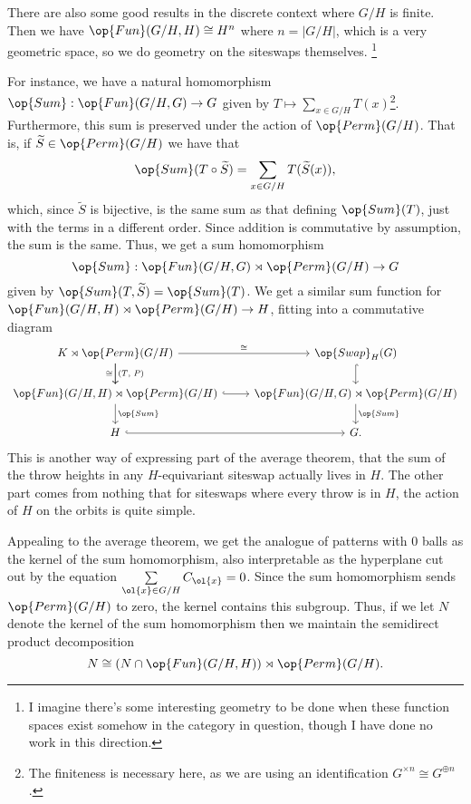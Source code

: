 \documentclass[12nt]{article}
\theoremstyle{plain}
\begin{document}
There are also some good results in the discrete context where $G/H$ is finite. Then we have $\op{Fun}(G/H, H) \cong H^n$ where $n = |G/H|$, which is a very geometric space, so we do geometry on the siteswaps themselves. \footnote{I imagine there's some interesting geometry to be done when these function spaces exist somehow in the category in question, though I have done no work in this direction.}

For instance, we have a natural homomorphism $\op{Sum} : \op{Fun}(G/H, G) \to G$ given by $T \mapsto \sum \limits_{x \in G/H} T(x)$\footnote{The finiteness is necessary here, as we are using an identification $G^{\times n} \cong G^{\oplus n}$.}. Furthermore, this sum is preserved under the action of $\op{Perm}(G/H)$. That is, if $\widetilde{S} \in \op{Perm}(G/H)$ we have that 
\[
\op{Sum}(T \circ \widetilde{S}) = \sum \limits_{x \in G/H} T(\widetilde{S}(x)),
\]
which, since $\widetilde{S}$ is bijective, is the same sum as that defining $\op{Sum}(T)$, just with the terms in a different order. Since addition is commutative by assumption, the sum is the same. Thus, we get a sum homomorphism 
\[
\op{Sum} : \op{Fun}(G/H, G) \rtimes \op{Perm}(G/H) \to G
\]
given by $\op{Sum}(T, \widetilde{S}) = \op{Sum}(T)$. We get a similar sum function for $\op{Fun}(G/H, H) \rtimes \op{Perm}(G/H) \to H$, fitting into a commutative diagram 
\[
\begin{tikzcd}
K \rtimes \op{Perm}(G/H) \ar[r, "\cong"] \ar[d, "(T \text{, } P)"] \ar[d, "\cong"'] & \op{Swap}_H(G) \ar[d, hookrightarrow] \\
\op{Fun}(G/H, H) \rtimes \op{Perm}(G/H) \ar[r, hookrightarrow] \ar[d, "\op{Sum}"] &  \op{Fun}(G/H, G) \rtimes \op{Perm}(G/H) \ar[d, "\op{Sum}"] \\
H \ar[r, hookrightarrow] & G.
\end{tikzcd}
\] 
This is another way of expressing part of the average theorem, that the sum of the throw heights in any $H$-equivariant siteswap actually lives in $H$. The other part comes from nothing that for siteswaps where every throw is in $H$, the action of $H$ on the orbits is quite simple. 

Appealing to the average theorem, we get the analogue of patterns with 0 balls as the kernel of the sum homomorphism, also interpretable as the hyperplane cut out by the equation $\sum \limits_{\ol{x} \in G/H} C_{\ol{x}} = 0$. Since the sum homomorphism sends $\op{Perm}(G/H)$ to zero, the kernel contains this subgroup. Thus, if we let $N$ denote the kernel of the sum homomorphism then we maintain the semidirect product decomposition 
\[
N \cong (N \cap \op{Fun}(G/H, H)) \rtimes \op{Perm}(G/H).
\]
\end{document}
